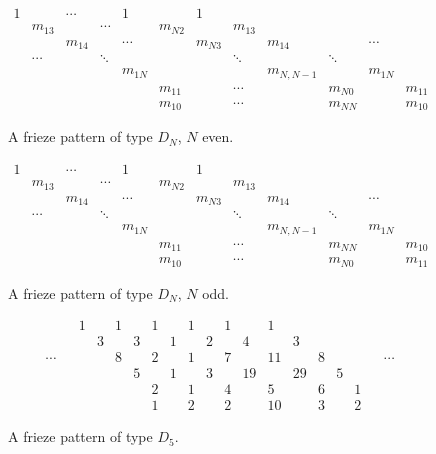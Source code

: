 \documentclass[a4paper]{amsart}
\begin{document}
\begin{figure}
$$\begin{array}{ccccccccccccc}
1 && \cdots && 1 && 1 &&&&&& \\
&m_{13}&      &\cdots&         &m_{N2} &         &m_{13}    &        &    &        &       &        \\
&      &m_{14}&      &\cdots   &         &m_{N3} &          &m_{14} &    &       \cdots  &  &        \\
&\cdots&         &\ddots   &         &        &          &\ddots  &     &\ddots       &       &        \\
&      &      &         &m_{1N}  &        &          &        &m_{N,N-1}&             &m_{1N}&        \\
&      &      &         &         &m_{11}&          &\cdots  &         &m_{N0}    &       &m_{11}\\
&       &      &         &         &m_{10}&          &\cdots  &         &m_{NN}    &       &m_{10}
\end{array}
$$
\caption{A frieze pattern of type $D_N$, $N$ even.}
\label{fig:dpatterneven}
\end{figure}

\begin{figure}
$$\begin{array}{ccccccccccccc}
1 && \cdots && 1 && 1 &&&&&& \\
&m_{13}&      &\cdots&         &m_{N2} &         &m_{13}    &        &    &        &       &        \\
&      &m_{14}&      &\cdots   &         &m_{N3} &          &m_{14} &    &       \cdots  &  &        \\
&\cdots&         &\ddots   &         &        &          &\ddots  &     &\ddots       &       &        \\
&      &      &         &m_{1N}  &        &          &        &m_{N,N-1}&             &m_{1N}&        \\
&      &      &         &         &m_{11}&          &\cdots  &         &m_{NN}    &       &m_{10}\\
&       &      &         &         &m_{10}&          &\cdots  &         &m_{N0}    &       &m_{11}
\end{array}
$$
\caption{A frieze pattern of type $D_N$, $N$ odd.}
\label{fig:dpatternodd}
\end{figure}

\begin{figure}
$$\begin{array}{ccccccccccccccccccc}
&&1 && 1 && 1 && 1 && 1 && 1 &&&&&& \\
&&& 3 && 3 && 1 && 2 && 4 && 3 &&&&& \\
\cdots &&&& 8 && 2 && 1 && 7 && 11 && 8 && && \cdots \\
&&&&& 5 && 1 && 3 && 19 && 29 && 5 &&& \\
&&&&&& 2 && 1 && 4 && 5 && 6 && 1 &&\\
&&&&&& 1 && 2 && 2 && 10 && 3 && 2 &&
\end{array}
$$
\caption{A frieze pattern of type $D_5$.}
\label{fig:D5examplefrieze}
\end{figure}
\end{document}
